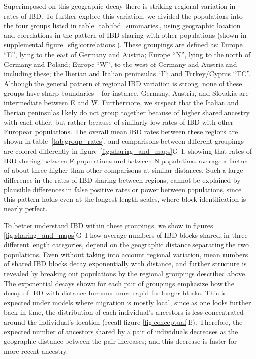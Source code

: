 \documentclass{article}
\begin{document}
Superimposed on this geographic decay there is striking regional variation in rates of IBD.
To further explore this variation, we divided the populations into 
the four groups listed in table~\ref{tab:ibd_summaries},
using geographic location and correlations in the pattern of IBD sharing with other populations
(shown in supplemental figure~\ref{sfig:correlations}).
These groupings are defined as:
Europe ``E'', lying to the east of Germany and Austria;
Europe ``N'', lying to the north of Germany and Poland;
Europe ``W'', to the west of Germany and Austria and including these;
the Iberian and Italian peninsulas ``I''; and Turkey/Cyprus ``TC''.
Although the general pattern of regional IBD variation is strong,
none of these groups have sharp boundaries -- for instance, Germany, Austria, and Slovakia are intermediate between E and W. 
Furthermore, we suspect that the Italian and Iberian peninsulas likely
do not group together because of higher shared ancestry with each other,
but rather because of similarly low rates of IBD with other European populations. 
The overall mean IBD rates between these regions are shown in table~\ref{tab:group_rates},
and comparisons between different groupings are colored differently in figure~\ref{fig:sharing_and_maps}G--I,
showing that rates of IBD sharing between E populations and between N populations average
a factor of about three higher than other comparisons at similar
distances. Such a large difference in the rates of IBD sharing between
regions, cannot
be explained by plausible differences in false
positive rates or power between populations, since this pattern holds even
at the longest length scales, where block identification is nearly perfect.

To better understand IBD within these groupings,
we show in figures \ref{fig:sharing_and_maps}G--I how average numbers of IBD blocks shared, 
in three different length categories,
depend on the geographic distance separating the two populations.
Even without taking into account regional variation,
mean numbers of shared IBD blocks decay exponentially with distance,
and further structure is revealed by breaking out populations by the regional groupings described above.
The exponential decays shown for each pair of groupings 
emphasize how the decay of IBD with distance becomes more rapid for longer blocks.
This is expected under models where migration is mostly local, since
as one looks further back in time,
the distribution of each individual's ancestors is less concentrated around the individual's location
(recall figure \ref{fig:conceptual}B).
Therefore, the expected number of ancestors shared by a pair of individuals decreases 
as the geographic distance between the pair increases;
and this decrease is faster for more recent ancestry.
\end{document}
